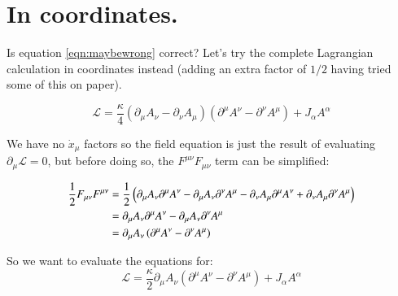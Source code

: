 \documentclass{article}
\newcommand{\LL}[0]{\mathcal{L}}
\begin{document}
\section{ In coordinates. }

Is equation \ref{eqn:maybewrong} correct?  Let's try the complete Lagrangian calculation in coordinates instead (adding an extra factor of $1/2$
having tried some of this on paper).

\begin{equation*}
\LL = \frac{\kappa}{4} ( \partial_{\mu} A_{\nu} - \partial_{\nu} A_{\mu} ) ( \partial^{\mu} A^{\nu} - \partial^{\nu} A^{\mu} ) + J_{\alpha} A^{\alpha}
\end{equation*}

We have no $\dot{x}_{\mu}$ factors so the field equation is just the result of evaluating $\partial_{\mu} \LL = 0$, but before doing so, the $F^{\mu\nu}F_{\mu\nu}$ term can be simplified:

\begin{align*}
\frac{1}{2} F_{\mu\nu}F^{\mu\nu}
&=
\frac{1}{2} \left(
 \partial_{\mu} A_{\nu} \partial^{\mu} A^{\nu}
-\partial_{\mu} A_{\nu} \partial^{\nu} A^{\mu}
-\partial_{\nu} A_{\mu} \partial^{\mu} A^{\nu}
+\partial_{\nu} A_{\mu} \partial^{\nu} A^{\mu} \right) \\
&=
\partial_{\mu} A_{\nu} \partial^{\mu} A^{\nu}
-\partial_{\mu} A_{\nu} \partial^{\nu} A^{\mu} \\
&= \partial_{\mu} A_{\nu} \left( \partial^{\mu} A^{\nu} -\partial^{\nu} A^{\mu} \right) \\
\end{align*}


So we want to evaluate the equations for:
\begin{equation*}
\LL = \frac{\kappa}{2} \partial_{\mu} A_{\nu} ( \partial^{\mu} A^{\nu} - \partial^{\nu} A^{\mu} ) + J_{\alpha} A^{\alpha}
\end{equation*}
\end{document}
